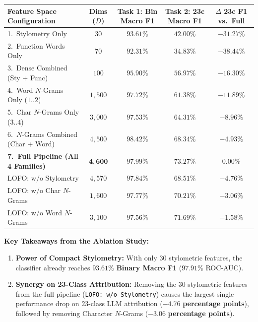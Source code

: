 \documentclass[11pt, a4paper]{article}
\begin{document}
\begin{center}
\small
\begin{tabular}{lcccc}
\toprule
\textbf{Feature Space Configuration} & \textbf{Dims ($D$)} & \textbf{Task 1: Bin Macro F1} & \textbf{Task 2: 23c Macro F1} & \textbf{$\Delta$ 23c F1 vs.\ Full} \\
\midrule
1.\ Stylometry Only & $30$ & $93.61\%$ & $42.00\%$ & $-31.27\%$ \\
2.\ Function Words Only & $70$ & $92.31\%$ & $34.83\%$ & $-38.44\%$ \\
3.\ Dense Combined (Sty + Func) & $100$ & $95.90\%$ & $56.97\%$ & $-16.30\%$ \\
4.\ Word $N$-Grams Only ($1..2$) & $1,500$ & $97.72\%$ & $61.38\%$ & $-11.89\%$ \\
5.\ Char $N$-Grams Only ($3..4$) & $3,000$ & $97.53\%$ & $64.31\%$ & $-8.96\%$ \\
6.\ $N$-Grams Combined (Char + Word) & $4,500$ & $\mathbf{98.42\%}$ & $68.34\%$ & $-4.93\%$ \\
\textbf{7.\ Full Pipeline (All 4 Families)} & $\mathbf{4,600}$ & $97.99\%$ & $\mathbf{73.27\%}$ & $\mathbf{0.00\%}$ \\
\midrule
LOFO: w/o Stylometry & $4,570$ & $97.84\%$ & $68.51\%$ & $\mathbf{-4.76\%}$ \\
LOFO: w/o Char $N$-Grams & $1,600$ & $97.77\%$ & $70.21\%$ & $\mathbf{-3.06\%}$ \\
LOFO: w/o Word $N$-Grams & $3,100$ & $97.56\%$ & $71.69\%$ & $-1.58\%$ \\
\bottomrule
\end{tabular}
\end{center}

\noindent\textbf{Key Takeaways from the Ablation Study:}
\begin{enumerate}[noitemsep]
    \item \textbf{Power of Compact Stylometry:} With only $30$ stylometric features, the classifier already reaches $\mathbf{93.61\%}$ \textbf{Binary Macro F1} ($97.91\%$ ROC-AUC).
    \item \textbf{Synergy on 23-Class Attribution:} Removing the $30$ stylometric features from the full pipeline (\texttt{LOFO: w/o Stylometry}) causes the largest single performance drop on $23$-class LLM attribution ($\mathbf{-4.76}$ \textbf{percentage points}), followed by removing Character $N$-Grams ($\mathbf{-3.06}$ \textbf{percentage points}).
\end{enumerate}
\end{document}
